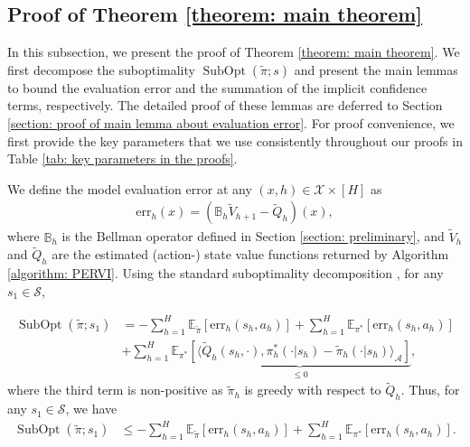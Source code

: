 \documentclass{article} \usepackage{iclr2023/iclr2023_conference,times}
\def\err{{\mathrm{err}}}
\DeclareMathOperator*{\subopt}{SubOpt}
\begin{document}
\color{black}

\subsection{Proof of Theorem \ref{theorem: main theorem}}
\label{subsection: proof of theorem 1}
In this subsection, we present the proof of Theorem \ref{theorem: main theorem}. We first decompose the suboptimality $\subopt(\tilde{\pi}; s)$ and present the main lemmas to bound the evaluation error and the summation of the implicit confidence terms, respectively. The detailed proof of these lemmas are deferred to Section \ref{section: proof of main lemma about evaluation error}. For proof convenience,  we first provide the key parameters that we use consistently throughout our proofs in Table \ref{tab: key parameters in the proofs}. 


We define the model evaluation error at any $(x,h) \in \mathcal{X} \times [H]$ as 
\begin{align}
    \err_h(x) = (\mathbb{B}_h \tilde{V}_{h+1} - \tilde{Q}_h)(x),
    \label{equation: model evaluation error}
\end{align}
where $\mathbb{B}_h$ is the Bellman operator defined in Section \ref{section: preliminary}, and $\tilde{V}_h$ and $\tilde{Q}_h$ are the estimated (action-) state value functions returned by Algorithm \ref{algorithm: PERVI}. Using the standard suboptimality decomposition \citep[Lemma~3.1]{jin2021pessimism}, for any $s_1 \in \mathcal{S}$,  



\begin{align*}
    \subopt(\tilde{\pi}; s_1) &= - \sum_{h=1}^H \mathbb{E}_{\tilde{\pi}} \left[ \err_h(s_h, a_h) \right] +  \sum_{h=1}^H \mathbb{E}_{\pi^*} \left[ \err_h(s_h, a_h) \right] \\
    &+ \sum_{h=1}^H \mathbb{E}_{\pi^*}  \underbrace{ \left[\langle \tilde{Q}_h(s_h, \cdot), \pi^*_h(\cdot | s_h) - \tilde{\pi}_h(\cdot | s_h)
    \rangle_{\mathcal{A}} \right]}_{\leq 0} ,
\end{align*}
where the third term is non-positive as $\tilde{\pi}_h$ is greedy with respect to $\tilde{Q}_h$. Thus, for any $s_1 \in \mathcal{S}$, we have 
\begin{align}
    \subopt(\tilde{\pi}; s_1) &\leq - \sum_{h=1}^H \mathbb{E}_{\tilde{\pi}} \left[ \err_h(s_h, a_h) \right] +  \sum_{h=1}^H \mathbb{E}_{\pi^*} \left[ \err_h(s_h, a_h) \right]. \label{eq: decompose subopt simplified}
\end{align}
\end{document}
